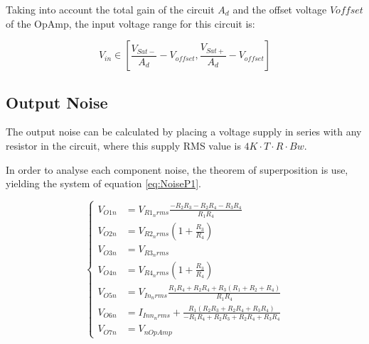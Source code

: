 Taking into account the total gain of the circuit $A_d$ and the offset voltage $V{offset}$ of the OpAmp, the input voltage range for this circuit is:

\begin{equation}
   V_{in} \in \left [ \frac{V_{Sat-}}{A_d} - V_{offset}, \frac{V_{Sat+}}{A_d} - V_{offset} \right ]
\end{equation}

\subsection{Output Noise}

The output noise can be calculated by placing a voltage supply in series with any resistor in the circuit, where this supply RMS value is $4K\cdot T\cdot R\cdot Bw$.

In order to analyse each component noise, the theorem of superposition is use, yielding the system of equation \ref{eq:NoiseP1}.

\begin{equation}
    \begin{cases}
        V_{O1n} &= V_{R1_nrms} \frac{- R_{2} R_{3} - R_{2} R_{4} - R_{3} R_{4}}{R_{1} R_{4}} \\
        V_{O2n} &= V_{R2_nrms} \left(1 + \frac{R_{3}}{R_{4}}\right)  \\
        V_{O3n} &= V_{R3_nrms}\\
        V_{O4n} &= V_{R4_nrms} \left(1 + \frac{R_{3}}{R_{4}} \right)\\
        V_{O5n} &= V_{In_nrms}\frac{ R_{1} R_{4} + R_{2} R_{4} + R_{3} \left(R_{1} + R_{2} + R_{4}\right)}{R_{1} R_{4}}\\
        V_{O6n} &= I_{Inn_nrms} + \frac{R_{1} \left(R_{2} R_{3} + R_{2} R_{4} + R_{3} R_{4}\right)}{- R_{1} R_{4} + R_{2} R_{3} + R_{2} R_{4} + R_{3} R_{4}} \\
        V_{O7n} &= V_{nOpAmp}
    \end{cases}
    \label{eq:NoiseP1}
\end{equation}